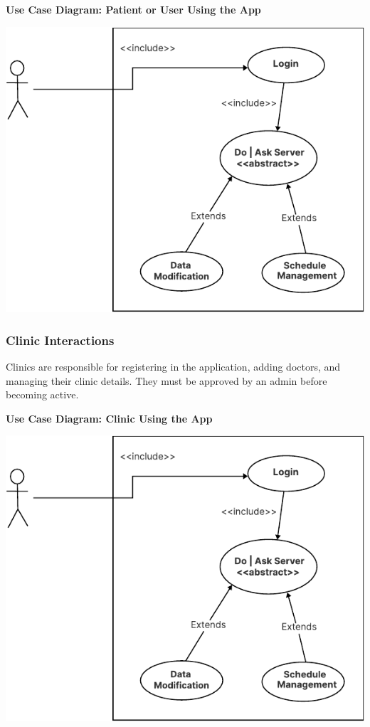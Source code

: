 \documentclass[12pt]{report}
\begin{document}
\vspace{0.5cm}
\noindent \textbf{Use Case Diagram: Patient or User Using the App}
\begin{center}
	\includegraphics[width=\textwidth]{images/doctorCAS.pdf} %
\end{center}

\subsubsection{\textbf{Clinic Interactions}}
Clinics are responsible for registering in the application, adding doctors, and managing their clinic details. They must be approved by an admin before becoming active.

\vspace{0.5cm}
\noindent \textbf{Use Case Diagram: Clinic Using the App}
\begin{center}
	\includegraphics[width=\textwidth]{images/doctorCAS.pdf} %
\end{center}
\end{document}
